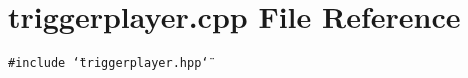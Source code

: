 \section{triggerplayer.cpp File Reference}
\label{triggerplayer_8cpp}
{\tt \#include \char`\"{}triggerplayer.hpp\char`\"{}}\par
